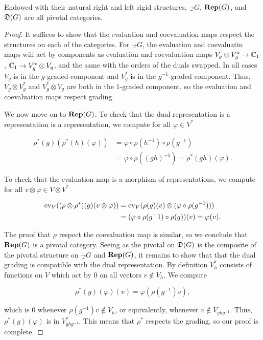 \begin{prop}\label{examples-are-pivotal} Endowed with their natural right and left rigid structures, $\Vec_G$, ${\bf Rep}(G)$, and ${\mathfrak D}(G)$ are all pivotal categories.
\end{prop}
\begin{proof} It suffices to show that the evaluation and coevaluation maps respect the structures on each of the categories. For $\Vec_G$, the evaluation and coevaluatin maps will act by components as evaluation and coevaluation maps $V_g\otimes V_g^*\to {\mathbb C}_1$, ${\mathbb C}_1\to V_g^*\otimes V_g$, and the same with the orders of the duals swapped. In all cases $V_g$ is in the $g$-graded component and $V_g^*$  is in the $g^{-1}$-graded component. Thus, $V_g\otimes V_g^*$ and $V_g^*\otimes V_g$ are both in the $1$-graded component, so the evaluation and coevaluation maps respect grading.

We now move on to ${\bf Rep}(G)$. To check that the dual representation is a representation is a representation, we compute for all $\varphi \in V^*$

\begin{align*}
\rho^*(g)(\rho^*(h)(\varphi))&=\varphi\circ \rho(h^{-1})\circ \rho(g^{-1})\\
&=\varphi\circ \rho((gh)^{-1})=\rho^*(gh)(\varphi).
\end{align*}

To check that the evaluation map is a morphism of representations, we compute for all $v\otimes \varphi\in V\otimes V^*$

\begin{align*}
\operatorname{ev}_{V}((\rho\otimes \rho^*)(g)(v\otimes \varphi))&=\operatorname{ev}_V(\rho(g)(v)\otimes (\varphi \circ \rho(g^{-1})))\\
&=(\varphi \circ \rho(g^-1)\circ \rho(g))(v)=\varphi(v).
\end{align*}

The proof that $\rho$ respect the coevaluation map is similar, so we conclude that ${\bf Rep}(G)$ is a pivotal category. Seeing as the pivotal on ${\mathfrak D}(G)$ is the composite of the pivotal structure on $\Vec_G$ and ${\bf Rep}(G)$, it remains to show that that the dual grading is compatible with the dual representation. By definition $V_h^*$ consists of functions on $V$ which act by $0$ on all vectors $v\not\in V_h$. We compute

$$\rho^*(g)(\varphi)(v)=\varphi(\rho(g^{-1})v),$$

which is $0$ whenever $\rho(g^{-1})v\not\in V_{h}$, or equivalently, whenever $v\not\in V_{ghg^{-1}}$. Thus, $\rho^*(g)(\varphi)$ is in $V_{ghg^{-1}}^*$. This means that $\rho^*$ respects the grading, so our proof is complete.
\end{proof}

